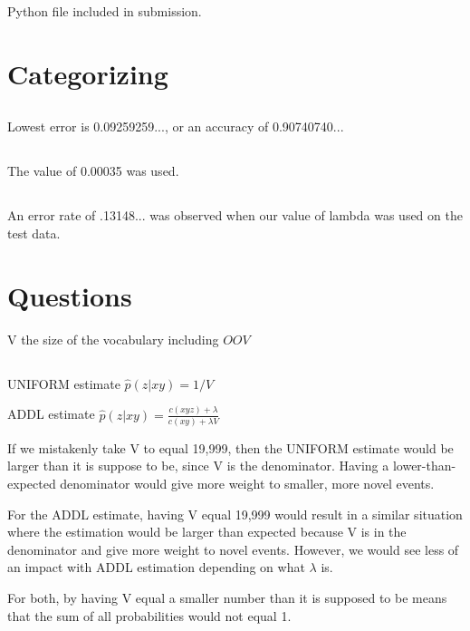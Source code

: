 \documentclass[12pt, letterpaper]{article}
\begin{document}
Python file included in submission.

\section{Categorizing}

\subsection{}

Lowest error is 0.09259259..., or an accuracy of 0.90740740...

\subsection{}

The value of 0.00035 was used.

\subsection{}

An error rate of .13148... was observed when our value of lambda was used on the test data.

\section{Questions}

V the size of the vocabulary including $OOV$

\subsection{}

UNIFORM estimate $\hat{p}(z | xy) = 1 / V$

ADDL estimate $\hat{p}(z | xy) = \frac{c(xyz) + \lambda}{c(xy) + \lambda V}$

If we mistakenly take V to equal 19,999, then the UNIFORM estimate would be larger than it is suppose to be, since V is the denominator. Having a lower-than-expected denominator would give more weight to smaller, more novel events.

For the ADDL estimate, having V equal 19,999 would result in a similar situation where the estimation would be larger than expected because V is in the denominator and give more weight to novel events. However, we would see less of an impact with ADDL estimation depending on what $\lambda$ is. 

For both, by having V equal a smaller number than it is supposed to be means that the sum of all probabilities would not equal 1. 
\end{document}
